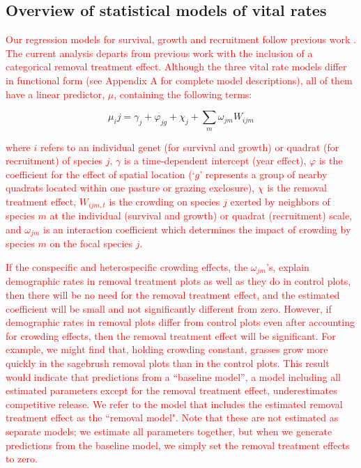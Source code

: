 \documentclass[11pt]{article}
\newcommand{\new}{\textcolor{red}}
\begin{document}
\begin{doublespacing}
\subsection*{Overview of statistical models of vital rates}

\new{
Our regression models for survival, growth and recruitment follow previous work \citep{adler_coexistence_2010,chu_large_2015}. The current analysis departs from previous work with the inclusion of a categorical removal treatment effect. Although the three vital rate models differ in functional form (see Appendix A for complete model descriptions), all of them have a linear predictor, $\mu$, containing the following terms:}

\begin{equation}
\mu_ij = \gamma_j+ \varphi_{jg}+  \chi_j  + \sum \limits_{m} \omega_{jm} {W}_{ijm}
\label{eqn:survReg}
\end{equation}

\new{where $i$ refers to an individual genet (for survival and growth) or quadrat (for recruitment) of species $j$, $\gamma$ is a time-dependent intercept (year effect), $\varphi$ is the coefficient for the effect of spatial location (`$g$' represents a group of nearby quadrats located within one pasture or grazing exclosure), $\chi$ is the removal treatment effect, 
$W_{ijm,t}$ is the crowding on species $j$ exerted by neighbors of species $m$ at the individual (survival and growth) or
quadrat (recruitment) scale, and $\omega_{jm}$ is an interaction coefficient which determines the impact of crowding by species $m$ on the 
focal species $j$. }

\new{If the conspecific and heterospecific crowding effects, the $\omega_{jm}$'s, explain demographic rates in removal treatment plots as well as they do in control plots, then there will be no need for the removal treatment effect, and the estimated coefficient will be small and not significantly different from zero. However, if demographic rates in removal plots differ from control plots even after accounting for crowding effects, then the removal treatment effect will be significant. For example, we might find that, holding crowding constant, grasses grow more quickly in the sagebrush removal plots than in the control plots. This result would indicate that predictions from a ``baseline model'', a model including all estimated parameters except for the removal treatment effect, underestimates competitive release. We refer to the model that includes the estimated removal treatment effect as the ``removal model". Note that these are not estimated as separate models; we estimate all parameters together, but when we generate predictions from the baseline model, we simply set the removal treatment effects to zero.} %


\end{doublespacing}
\end{document}
